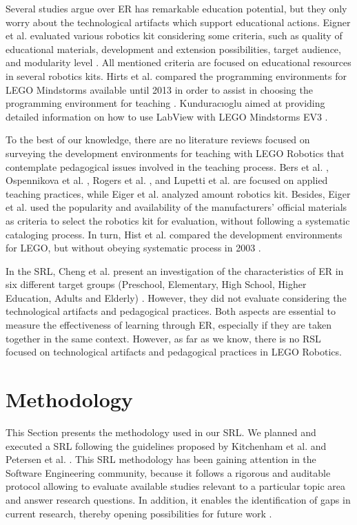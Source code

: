 \documentclass[conference]{IEEEtran}
\begin{document}
Several studies argue over ER has remarkable education potential, but they only worry about the technological artifacts which support educational actions. Eigner et al. evaluated various robotics kit considering some criteria, such as quality of educational materials, development and extension possibilities, target audience, and modularity level \cite{Eigner}. All mentioned criteria are focused on educational resources in several robotics kits. Hirts et al. compared the programming environments for LEGO Mindstorms available until 2013 in order to assist in choosing the programming environment for teaching \cite{Hirst}. Kunduracıoglu aimed at providing detailed information on how to use LabView with LEGO Mindstorms EV3 \cite{Kunduracıoglu}.

To the best of our knowledge, there are no literature reviews focused on surveying the development environments for teaching with LEGO Robotics that contemplate pedagogical issues involved in the teaching process. Bers et al. \cite{Bers}, Ospennikova et al. \cite{Ospennikova}, Rogers et al. \cite{Rogers}, and Lupetti et al. \cite{Lupetti} are focused on applied teaching practices, while Eiger et al. \cite{Eigner} analyzed amount robotics kit. Besides, Eiger et al. used the popularity and availability of the manufacturers’ official materials as criteria to select the robotics kit for evaluation, without following a systematic cataloging process. In turn, Hist et al. compared the development environments for LEGO, but without obeying systematic process in 2003 \cite{Hirst}.

In the SRL, Cheng et al. present an investigation of the characteristics of ER in six different target groups (Preschool, Elementary, High School, Higher Education, Adults and Elderly) \cite{Cheng}. However, they did not evaluate considering the technological artifacts and pedagogical practices. Both aspects are essential to measure the effectiveness of learning through ER, especially if they are taken together in the same context. However, as far as we know, there is no RSL focused on technological artifacts and pedagogical practices in LEGO Robotics.


\section{Methodology}

This Section presents the methodology used in our SRL. We planned and executed a SRL following the guidelines proposed by Kitchenham et al. \cite{Kitchenham} and Petersen et al. \cite{Petersen}. This SRL methodology has been gaining attention in the Software Engineering community, because it follows a rigorous and auditable protocol allowing to  evaluate available studies relevant to a particular topic area and answer research questions. In addition, it enables the identification of gaps in current research, thereby opening possibilities for future work \cite{Kitchenham}.
\end{document}
